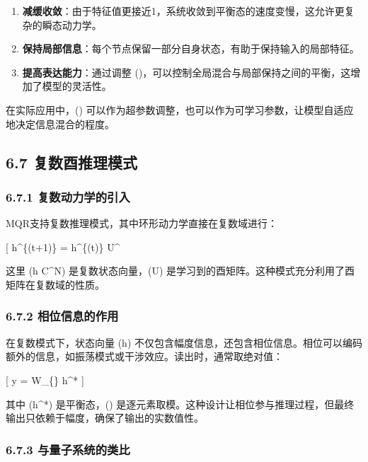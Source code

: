 \documentclass[
  12pt,
]{article}
\providecommand{\tightlist}{%
  \setlength{\itemsep}{0pt}\setlength{\parskip}{0pt}}
\begin{document}
\begin{enumerate}
\def\labelenumi{\arabic{enumi}.}
\tightlist
\item
  \textbf{减缓收敛}：由于特征值更接近1，系统收敛到平衡态的速度变慢，这允许更复杂的瞬态动力学。
\item
  \textbf{保持局部信息}：每个节点保留一部分自身状态，有助于保持输入的局部特征。
\item
  \textbf{提高表达能力}：通过调整
  (\beta)，可以控制全局混合与局部保持之间的平衡，这增加了模型的灵活性。
\end{enumerate}

在实际应用中，(\beta)
可以作为超参数调整，也可以作为可学习参数，让模型自适应地决定信息混合的程度。

\hypertarget{ux590dux6570ux9149ux63a8ux7406ux6a21ux5f0f}{%
\subsection{6.7
复数酉推理模式}\label{ux590dux6570ux9149ux63a8ux7406ux6a21ux5f0f}}

\hypertarget{ux590dux6570ux52a8ux529bux5b66ux7684ux5f15ux5165}{%
\subsubsection{6.7.1
复数动力学的引入}\label{ux590dux6570ux52a8ux529bux5b66ux7684ux5f15ux5165}}

MQR支持复数推理模式，其中环形动力学直接在复数域进行：

{[} h\^{}\{(t+1)\} = h\^{}\{(t)\} U\^{}\dagger {]}

这里 (h \in C\^{}N) 是复数状态向量，(U)
是学习到的酉矩阵。这种模式充分利用了酉矩阵在复数域的性质。

\hypertarget{ux76f8ux4f4dux4fe1ux606fux7684ux4f5cux7528}{%
\subsubsection{6.7.2
相位信息的作用}\label{ux76f8ux4f4dux4fe1ux606fux7684ux4f5cux7528}}

在复数模式下，状态向量 (h)
不仅包含幅度信息，还包含相位信息。相位可以编码额外的信息，如振荡模式或干涉效应。读出时，通常取绝对值：

{[} y = W\_\{\} \cdot \textbar h\^{}*\textbar{} {]}

其中 (h\^{}*) 是平衡态，(\textbar{}\cdot\textbar)
是逐元素取模。这种设计让相位参与推理过程，但最终输出只依赖于幅度，确保了输出的实数值性。

\hypertarget{ux4e0eux91cfux5b50ux7cfbux7edfux7684ux7c7bux6bd4}{%
\subsubsection{6.7.3
与量子系统的类比}\label{ux4e0eux91cfux5b50ux7cfbux7edfux7684ux7c7bux6bd4}}
\end{document}
